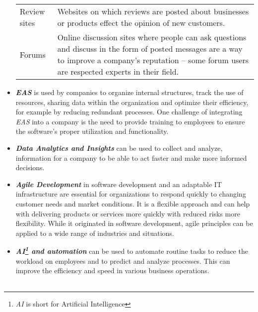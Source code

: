 \documentclass[a4]{scrartcl}
\begin{document}
\begin{itemize}
\begin{tabular}{l|p{10.5cm}}
			Review sites & Websites on which reviews are posted about businesses or products effect the opinion of new customers.~\cite{socialmedia} \\
			
			Forums & Online discussion sites where people can ask questions and discuss in the form of posted messages are a way to improve a company's reputation -- some forum users are respected experts in their field.~\cite{socialmedia} \\
			
			
		\end{tabular}

		
		
		
		
		
		
		\item \textit{\textbf{EAS}} is used by companies to organize internal structures, track the use of resources, sharing data within the organization and optimize their efficiency, for example by reducing redundant processes. One challenge of integrating \textit{EAS} into a company is the need to provide training to employees to ensure the software's proper utilization and functionality.~\cite{eas1, eas2}
		
		
		
		\item \textit{\textbf{Data Analytics and Insights}} can be used to collect and analyze, information for a company to be able to act faster and make more informed decisions.~\cite{dataan}
		
		
		\item \textit{\textbf{Agile Development}} in software development and an adaptable IT infrastructure are essential for organizations to respond quickly to changing customer needs and market conditions. It is a flexible approach and can help with delivering products or services more quickly with reduced risks more flexibility. While it originated in software development, agile principles can be applied to a wide range of industries and situations.~\cite{agile}
		
		
		
		\item \textit{\textbf{AI\footnote{\textit{AI} is short for Artificial Intelligence} and automation}} can be used to automate routine tasks to reduce the workload on employees and to predict and analyze processes. This can improve the efficiency and speed in various business operations.~\cite{ai}
		
		\begin{tabular}{l|p{10.5cm}}
			

\end{tabular}
\end{itemize}
\end{document}
